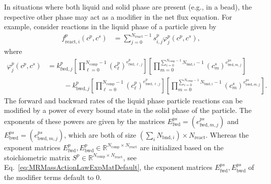 In situations where both liquid and solid phase are present (e.g., in a bead), the respective other phase may act as a modifier in the net flux equation.
For example, consider reactions in the liquid phase of a particle given by
\begin{align*}
  f_{\text{react},i}^p\left(c^p, c^s\right) &= \sum_{j=0}^{N_{\text{react}}-1} s_{i,j}^p \varphi^p_j\left(c^p, c^s\right),
\end{align*}
where
\begin{equation*} \begin{split}
  \varphi^p_j(c^p, c^s) &= k^p_{\text{fwd},j} \left[\prod_{\ell=0}^{N_{\text{comp}}-1} \left(c^p_{\ell}\right)^{e^p_{\text{fwd},\ell,j}}\right] \left[\prod_{m=0}^{\sum_{i=0}^{N_{\text{comp}}-1} N_{\text{bnd},i}-1} \left(c^s_{m}\right)^{e^{ps}_{\text{fwd},m,j}}\right] \\
  &\phantom{=}\quad - k^p_{\text{bwd},j} \left[\prod_{\ell=0}^{N_{\text{comp}}-1} \left(c^p_{\ell}\right)^{e^p_{\text{bwd},\ell,j}}\right] \left[\prod_{m=0}^{\sum_{i=0}^{N_{\text{comp}}-1} N_{\text{bnd},i}-1} \left(c^s_{m}\right)^{e^{ps}_{\text{bwd},m,j}}\right].
\end{split} \end{equation*}
The forward and backward rates of the liquid phase particle reactions can be modified by a power of every bound state in the solid phase of the particle.
The exponents of these powers are given by the matrices $E^{ps}_{\text{fwd}} = (e^{ps}_{\text{fwd},m,j})$ and $E^{ps}_{\text{bwd}} = (e^{ps}_{\text{bwd},m,j})$, which are both of size $(\sum_i N_{\text{bnd},i}) \times N_{\text{react}}$.
Whereas the exponent matrices $E^{p}_{\text{fwd}}, E^{p}_{\text{bwd}} \in \mathds{R}^{N_{\text{comp}} \times N_{\text{react}}}$ are initialized based on the stoichiometric matrix $S^{p} \in \mathds{R}^{N_{\text{comp}} \times N_{\text{react}}}$, see Eq.~\eqref{eq:MRMassActionLawExpMatDefault}, the exponent matrices $E^{ps}_{\text{fwd}}, E^{ps}_{\text{bwd}}$ of the modifier terms default to $0$.

